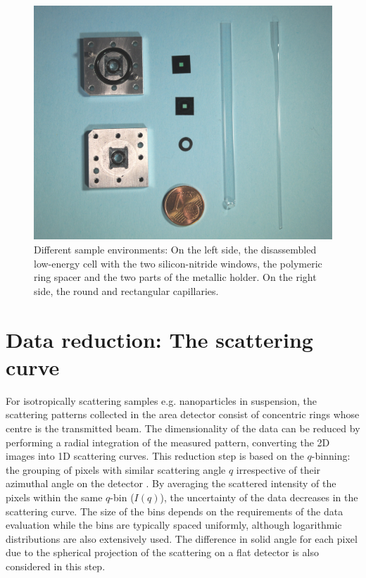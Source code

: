 \begin{figure}%
		\includegraphics[width=0.9\linewidth]{Figures/SampleEnvironment.jpg}
		\caption[Sample environments for SAXS experiments in vacuum.]{Different sample environments: On the left side, the disassembled low-energy cell with the two silicon-nitride windows, the polymeric ring spacer and the two parts of the metallic holder. On the right side, the round and rectangular capillaries.}
	        \label{fig:SampleEnvironment}
\end{figure}

\section{Data reduction: The scattering curve}
\label{sec:data_reduction}

For isotropically scattering samples e.g. nanoparticles in suspension, the scattering patterns collected in the area detector consist of concentric rings whose centre is the transmitted beam. The dimensionality of the data can be reduced by performing a radial integration of the measured pattern, converting the 2D images into 1D scattering curves. This reduction step is based on the $q$-binning: the grouping of pixels with similar scattering angle $q$ irrespective of their azimuthal angle on the detector \citep{pauw_everything_2013}. By averaging the scattered intensity of the pixels within the same $q$-bin ($I(q)$), the uncertainty of the data decreases in the scattering curve. The size of the bins depends on the requirements of the data evaluation while the bins are typically spaced uniformly, although logarithmic distributions are also extensively used. The difference in solid angle for each pixel due to the spherical projection of the scattering on a flat detector is also considered in this step.

